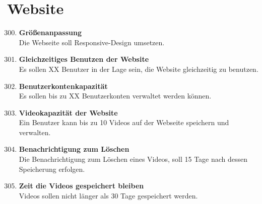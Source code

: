 \section{Website}
\begin{enumerate}[\bfseries{NA}10]
\setcounter{enumi}{299}

\item \textbf{Größenanpassung} \hfill\\  Die Webseite soll Responsive-Design umsetzen.

\item \textbf{Gleichzeitiges Benutzen der Website} \hfill\\  Es sollen XX Benutzer in der Lage sein, die Website gleichzeitig zu benutzen.

\item \textbf{Benutzerkontenkapazität} \hfill\\  Es sollen bis zu XX Benutzerkonten verwaltet werden können.

\item \textbf{Videokapazität der Website} \hfill\\  Ein Benutzer kann bis zu 10 Videos auf der Webseite speichern und verwalten.

\item \textbf{Benachrichtigung zum Löschen} \hfill\\  Die Benachrichtigung zum Löschen eines Videos, soll 15 Tage nach dessen Speicherung erfolgen.

\item \textbf{Zeit die Videos gespeichert bleiben} \hfill\\  Videos sollen nicht länger als 30 Tage gespeichert werden.
\end{enumerate}





